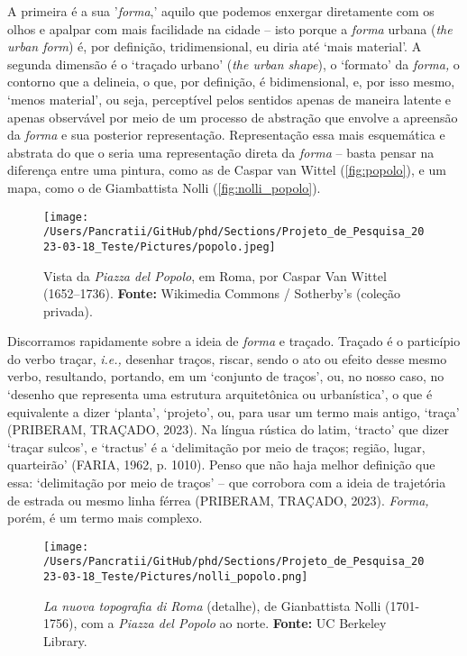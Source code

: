 \documentclass[12pt, a4paper]{book} %
\begin{document}
	        A primeira é a sua '\textit{forma},' aquilo que podemos enxergar diretamente com os olhos e apalpar com mais facilidade na cidade – isto porque a \textit{forma} urbana (\textit{the urban form}) é, por definição, tridimensional, eu diria até `mais material'. A segunda dimensão é o `traçado urbano' (\textit{the urban shape}), o `formato' da \textit{forma,} o contorno que a delineia, o que, por definição, é bidimensional, e, por isso mesmo, `menos material', ou seja, perceptível pelos sentidos apenas de maneira latente e apenas observável por meio de um processo de abstração que envolve a apreensão da \textit{forma} e sua posterior representação. Representação essa mais esquemática e abstrata do que o seria uma representação direta da \textit{forma} – basta pensar na diferença entre uma pintura, como as de Caspar van Wittel (\autoref{fig:popolo}), e um mapa, como o de Giambattista Nolli (\autoref{fig:nolli_popolo}).

            \begin{figure}[h]
	            \centering
	            \texttt{[image: /Users/Pancratii/GitHub/phd/Sections/Projeto\_de\_Pesquisa\_2023-03-18\_Teste/Pictures/popolo.jpeg]} 
	            \captionsetup{labelfont=bf}
	            \caption{Vista da \textit{Piazza del Popolo}, em Roma, por Caspar Van Wittel (1652–1736). \textbf{Fonte:} Wikimedia Commons / Sotherby's (coleção privada).}
	            \label{fig:popolo}
            \end{figure}   

            Discorramos rapidamente sobre a ideia de \textit{forma} e traçado. Traçado é o particípio do verbo traçar, \textit{i.e.,} desenhar traços, riscar, sendo o ato ou efeito desse mesmo verbo, resultando, portando, em um `conjunto de traços', ou, no nosso caso, no `desenho que representa uma estrutura arquitetônica ou urbanística', o que é equivalente a dizer `planta', `projeto', ou, para usar um termo mais antigo, `traça' (PRIBERAM, TRAÇADO, 2023). Na língua rústica do latim, `tracto' que dizer `traçar sulcos', e `tractus' é a `delimitação por meio de traços; região, lugar, quarteirão' (FARIA, 1962, p. 1010). Penso que não haja melhor definição que essa: `delimitação por meio de traços' – que corrobora com a ideia de trajetória de estrada ou mesmo linha férrea (PRIBERAM, TRAÇADO, 2023). \textit{Forma,} porém, é um termo mais complexo.

            \begin{figure}
	            \centering
	            \texttt{[image: /Users/Pancratii/GitHub/phd/Sections/Projeto\_de\_Pesquisa\_2023-03-18\_Teste/Pictures/nolli\_popolo.png]}
	            \captionsetup{labelfont=bf}
	            \caption{\textit{La nuova topografia di Roma} (detalhe), de Gianbattista Nolli (1701-1756), com a \textit{Piazza del Popolo} ao norte. \textbf{Fonte:} UC Berkeley Library.}
	            \label{fig:nolli_popolo}
            \end{figure} 
\end{document}
